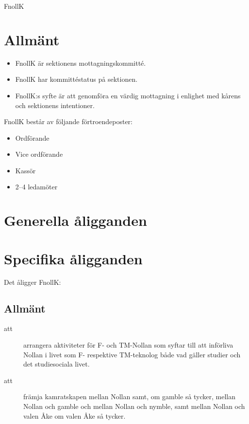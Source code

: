 \documentclass[a4paper]{article}
\begin{document}
\renewcommand{\forening}{FnollK} %

\begin{foreningenv}{\forening{}} %
    \section{Allmänt}
    \begin{itemize}
        \item FnollK är sektionens mottagningskommitté.
        \item FnollK har kommittéstatus på sektionen.
        \item FnollK:s syfte är att genomföra en värdig mottagning i enlighet med kårens och sektionens intentioner. 
    \end{itemize}
    
    FnollK består av följande förtroendeposter:
    \begin{itemize}
        \item Ordförande
        \item Vice ordförande
        \item Kassör
        \item 2--4 ledamöter
    \end{itemize}
    
    \section{Generella åligganden}
    \aliggkom{}
    
    \section{Specifika åligganden}
    Det åligger FnollK:
    
    \subsection{Allmänt}
    \begin{description}
        \item[att] arrangera aktiviteter för F- och TM-Nollan som syftar till att införliva Nollan i livet som F- respektive TM-teknolog både vad gäller studier och det studiesociala livet.
        \item[att] främja kamratskapen mellan Nollan samt, om gamble så tycker, mellan Nollan och gamble och mellan Nollan och nymble, samt mellan Nollan och valen Åke om valen Åke så tycker.
    \end{description}
    

\end{foreningenv}
\end{document}
